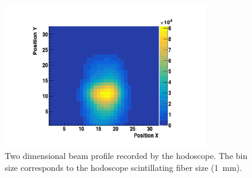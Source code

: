 \begin{figure}[!htbp]
\centering
\includegraphics[width=0.8\textwidth]{03_GraphicFiles/chapter6_BeamTests/Nice_May2018/map2D.pdf}
\caption{Two dimensional beam profile recorded by the hodoscope. The bin size corresponds to the hodoscope scintillating fiber size (1~mm).}
\label{chap6::fig::May_HodoMap2D}
\end{figure}


